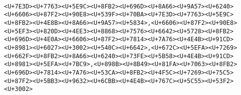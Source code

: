 \documentclass[
]{article}
\begin{document}
\begin{verbatim}
                                                                                                                                                                                                                                                                                                                                                                                                                                                                                                                                                                                                                                                                                                                                                                                                   <U+7E3D><U+7763><U+5E9C><U+8FB2><U+696D><U+8A66><U+9A57><U+6240><U+6606><U+87F2><U+90E8><U+539F><U+70BA><U+7E3D><U+7763><U+5E9C><U+8FB2><U+4E8B><U+8A66><U+9A57><U+5834>,<U+6606><U+87F2><U+90E8><U+5EF3><U+820D><U+4EE3><U+8868><U+7576><U+6642><U+5728><U+8FB2><U+696D><U+4E0A><U+6606><U+87F2><U+7814><U+7A76><U+4E4B><U+91CD><U+8981><U+6027><U+3002><U+540C><U+6642>,<U+672C><U+5EFA><U+7269><U+662F><U+8FB2><U+8A66><U+6240><U+73FE><U+5B58><U+4E4B><U+91CD><U+8981><U+5EFA><U+7BC9>,<U+898B><U+8B49><U+81FA><U+7063><U+8FB2><U+696D><U+7814><U+7A76><U+53CA><U+8FB2><U+4F5C><U+7269><U+75C5><U+87F2><U+5BB3><U+9632><U+6CBB><U+4E4B><U+767C><U+5C55><U+53F2><U+3002>

\end{verbatim}
\end{document}
